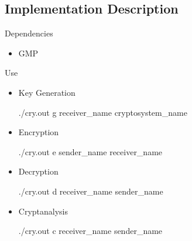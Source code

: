 \subsection{Implementation Description}


Dependencies
\begin{itemize}
  \item GMP
\end{itemize}

Use
\begin{itemize}
  \item Key Generation
  \begin{itemize}
    ./cry.out g {receiver_name} {cryptosystem_name}
  \end{itemize}
  \item Encryption
  \begin{itemize}
    ./cry.out e {sender_name} {receiver_name}
  \end{itemize}
  \item Decryption
  \begin{itemize}
    ./cry.out d {receiver_name} {sender_name}
  \end{itemize}
  \item Cryptanalysis
  \begin{itemize}
    ./cry.out c {receiver_name} {sender_name}
  \end{itemize}
\end{itemize}
